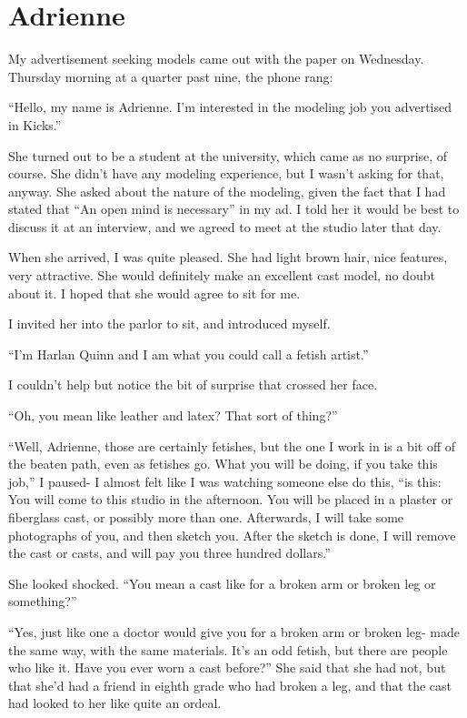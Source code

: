 \chapter{Adrienne}
    My advertisement seeking models came out with the paper on Wednesday. Thursday morning at a
quarter past nine, the phone rang:

    ``Hello, my name is Adrienne. I'm interested in the modeling job you advertised in Kicks.''

    She turned out to be a student at the university, which came as no surprise, of course. She
didn't have any modeling experience, but I wasn't asking for that, anyway. She asked about the
nature of the modeling, given the fact that I had stated that ``An open mind is necessary'' in
my ad. I told her it would be best to discuss it at an interview, and we agreed to meet at the
studio later that day.

    When she arrived, I was quite pleased. She had light brown hair, nice features, very
attractive. She would definitely make an excellent cast model, no doubt about it. I hoped that
she would agree to sit for me.

    I invited her into the parlor to sit, and introduced myself.

    ``I'm Harlan Quinn and I am what you could call a fetish artist.''

    I couldn't help but notice the bit of surprise that crossed her face.

    ``Oh, you mean like leather and latex? That sort of thing?''

    ``Well, Adrienne, those are certainly fetishes, but the one I work in is a bit off of the
beaten path, even as fetishes go. What you will be doing, if you take this job,'' I paused- I
almost felt like I was watching someone else do this, ``is this: You will come to this studio in
the afternoon. You will be placed in a plaster or fiberglass cast, or possibly more than one.
Afterwards, I will take some photographs of you, and then sketch you. After the sketch is done,
I will remove the cast or casts, and will pay you three hundred dollars.''

    She looked shocked. ``You mean a cast like for a broken arm or broken leg or something?''

    ``Yes, just like one a doctor would give you for a broken arm or broken leg- made the same
way, with the same materials. It's an odd fetish, but there are people who like it. Have you
ever worn a cast before?'' She said that she had not, but that she'd had a friend in eighth
grade who had broken a leg, and that the cast had looked to her like quite an ordeal.

